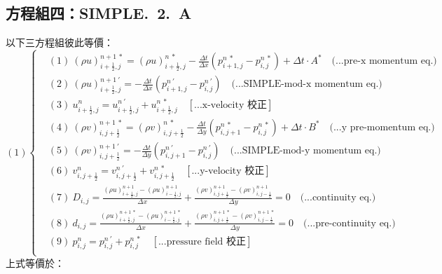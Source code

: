 \documentclass[12pt]{article}
\begin{document}
\subsection{方程組四：SIMPLE.\ 2.\ A}
\label{2.A.s}
\noindent 以下三方程組彼此等價：\\
\begin{equation}
(1)
\left\{
\begin{aligned}
    &(1)\ (\rho u)_{i+\frac{1}{2},j}^{n+1\ *} = (\rho u)_{i+\frac{1}{2},j}^{n\ *} - \frac{\Delta t}{\Delta x}(p_{i+1,j}^{n\ *} - p_{i,j}^{n\ *}) + \Delta t \cdot A^{*}  \quad \text{(...pre-x momentum eq.)}\\[1.5ex]
    &(2)\ (\rho u)_{i+\frac{1}{2},j}^{n+1\ \prime} = - \frac{\Delta t}{\Delta x}(p_{i+1,j}^{n\ \prime} - p_{i,j}^{n\ \prime})  \quad \text{(...SIMPLE-mod-x momentum eq.)}\\[1.5ex]
    &(3)\ u_{i+\frac{1}{2},j}^{n} = u_{i+\frac{1}{2},j}^{n\ \prime} + u_{i+\frac{1}{2},j}^{n\ *}  \quad \left[\text{...x-velocity 校正}\right]\\[1.5ex]
    &(4)\ (\rho v)_{i,j+\frac{1}{2}}^{n+1\ *} = (\rho v)_{i,j+\frac{1}{2}}^{n\ *} - \frac{\Delta t}{\Delta y}(p_{i,j+1}^{n\ *} - p_{i,j}^{n\ *}) + \Delta t \cdot B^{*}  \quad \text{(...y pre-momentum eq.)}\\[1.5ex]
    &(5)\ (\rho v)_{i,j+\frac{1}{2}}^{n+1\ \prime} =  - \frac{\Delta t}{\Delta y}(p_{i,j+1}^{n\ \prime} - p_{i,j}^{n\ \prime}) \quad \text{(...SIMPLE-mod-y momentum eq.)}\\[1.5ex]
    &(6)\ v_{i,j+\frac{1}{2}}^{n} = v_{i,j+\frac{1}{2}}^{n\ \prime} + v_{i,j+\frac{1}{2}}^{n\ *} \quad \left[\text{...y-velocity 校正}\right]\\[1.5ex]
    &(7)\ D_{i,j} = \frac{(\rho u)_{i+\frac{1}{2},j}^{n+1} - (\rho u)_{i-\frac{1}{2},j}^{n+1}}{\Delta x} + \frac{(\rho v)_{i,j+\frac{1}{2}}^{n+1} - (\rho v)_{i,j-\frac{1}{2}}^{n+1}}{\Delta y} = 0 \quad \text{(...continuity eq.)}\\[1.5ex]
    &(8)\ d_{i,j} = \frac{(\rho u)_{i+\frac{1}{2},j}^{n+1\ *} - (\rho u)_{i-\frac{1}{2},j}^{n+1\ *}}{\Delta x} + \frac{(\rho v)_{i,j+\frac{1}{2}}^{n+1\ *} - (\rho v)_{i,j-\frac{1}{2}}^{n+1\ *}}{\Delta y} = 0 \quad \text{(...pre-continuity eq.)}\\[1.5ex]
    &(9)\ p_{i,j}^{n} = p_{i,j}^{n\ \prime} + p_{i,j}^{n\ *} \quad\left[\text{...pressure field 校正}\right]\\[1.5ex]
\end{aligned}
\right.
\end{equation}
\noindent 上式等價於：\\
\end{document}
